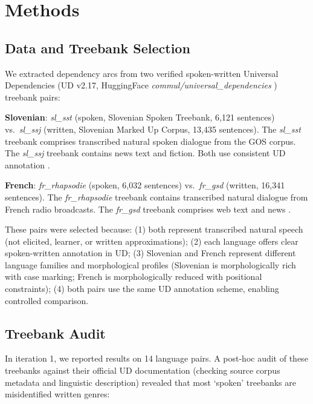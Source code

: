 \documentclass[11pt,letterpaper]{article}
\begin{document}
\section{Methods}

\subsection{Data and Treebank Selection}

We extracted dependency arcs from two verified spoken-written Universal Dependencies (UD v2.17, HuggingFace \textit{commul/universal\_dependencies} \citep{UDv217}) treebank pairs:

\textbf{Slovenian}: \textit{sl\_sst} (spoken, Slovenian Spoken Treebank, 6,121 sentences) vs.\ \textit{sl\_ssj} (written, Slovenian Marked Up Corpus, 13,435 sentences). The \textit{sl\_sst} treebank comprises transcribed natural spoken dialogue from the GOS corpus. The \textit{sl\_ssj} treebank contains news text and fiction. Both use consistent UD annotation \citep{Dobrovoljc2012}.

\textbf{French}: \textit{fr\_rhapsodie} (spoken, 6,032 sentences) vs.\ \textit{fr\_gsd} (written, 16,341 sentences). The \textit{fr\_rhapsodie} treebank contains transcribed natural dialogue from French radio broadcasts. The \textit{fr\_gsd} treebank comprises web text and news \citep{Lacheret2014}.

These pairs were selected because: (1) both represent transcribed natural speech (not elicited, learner, or written approximations); (2) each language offers clear spoken-written annotation in UD; (3) Slovenian and French represent different language families and morphological profiles (Slovenian is morphologically rich with case marking; French is morphologically reduced with positional constraints); (4) both pairs use the same UD annotation scheme, enabling controlled comparison.

\subsection{Treebank Audit}

In iteration 1, we reported results on 14 language pairs. A post-hoc audit of these treebanks against their official UD documentation (checking source corpus metadata and linguistic description) revealed that most `spoken' treebanks are misidentified written genres:
\end{document}
